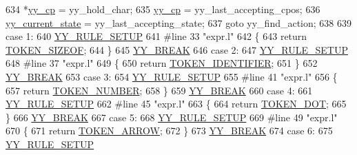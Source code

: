\begin{DoxyCode}
634                         *\mbox{\hyperlink{expr-lex_8cpp_aebf8322d98e81db5af081bb22a5f06fe}{yy\_cp}} = yy\_hold\_char;
635                         \mbox{\hyperlink{expr-lex_8cpp_aebf8322d98e81db5af081bb22a5f06fe}{yy\_cp}} = yy\_last\_accepting\_cpos;
636                         \mbox{\hyperlink{expr-lex_8cpp_abb8b9672f94e21056888ae611b41cd1b}{yy\_current\_state}} = yy\_last\_accepting\_state;
637                         \textcolor{keywordflow}{goto} yy\_find\_action;
638 
639 \textcolor{keywordflow}{case} 1:
640 \mbox{\hyperlink{expr-lex_8cpp_a690504b662e4281515bf12722df178ba}{YY\_RULE\_SETUP}}
641 \textcolor{preprocessor}{#line 33 "expr.l"}
642 \{
643         \textcolor{keywordflow}{return} \mbox{\hyperlink{expr_8cpp_a6e19bb26b1cf6e33e3021ad463c1abb2}{TOKEN\_SIZEOF}};
644 \}
645         \mbox{\hyperlink{expr-lex_8cpp_a3cc40a460ad7df816678bcc05241e84c}{YY\_BREAK}}
646 \textcolor{keywordflow}{case} 2:
647 \mbox{\hyperlink{expr-lex_8cpp_a690504b662e4281515bf12722df178ba}{YY\_RULE\_SETUP}}
648 \textcolor{preprocessor}{#line 37 "expr.l"}
649 \{
650         \textcolor{keywordflow}{return} \mbox{\hyperlink{expr_8cpp_a008e051bec0c25081d2800989f86bce7}{TOKEN\_IDENTIFIER}};
651 \}
652         \mbox{\hyperlink{expr-lex_8cpp_a3cc40a460ad7df816678bcc05241e84c}{YY\_BREAK}}
653 \textcolor{keywordflow}{case} 3:
654 \mbox{\hyperlink{expr-lex_8cpp_a690504b662e4281515bf12722df178ba}{YY\_RULE\_SETUP}}
655 \textcolor{preprocessor}{#line 41 "expr.l"}
656 \{
657         \textcolor{keywordflow}{return} \mbox{\hyperlink{expr_8cpp_afab46303ed22655c1acbdad1c6f78df3}{TOKEN\_NUMBER}};
658 \}
659         \mbox{\hyperlink{expr-lex_8cpp_a3cc40a460ad7df816678bcc05241e84c}{YY\_BREAK}}
660 \textcolor{keywordflow}{case} 4:
661 \mbox{\hyperlink{expr-lex_8cpp_a690504b662e4281515bf12722df178ba}{YY\_RULE\_SETUP}}
662 \textcolor{preprocessor}{#line 45 "expr.l"}
663 \{
664         \textcolor{keywordflow}{return} \mbox{\hyperlink{expr_8cpp_aa5a331da77f5956fbc4e825deed94687}{TOKEN\_DOT}};
665 \}       
666         \mbox{\hyperlink{expr-lex_8cpp_a3cc40a460ad7df816678bcc05241e84c}{YY\_BREAK}}
667 \textcolor{keywordflow}{case} 5:
668 \mbox{\hyperlink{expr-lex_8cpp_a690504b662e4281515bf12722df178ba}{YY\_RULE\_SETUP}}
669 \textcolor{preprocessor}{#line 49 "expr.l"}
670 \{
671         \textcolor{keywordflow}{return} \mbox{\hyperlink{expr_8cpp_af6b51f1bfc2736f77d7ad045926f470d}{TOKEN\_ARROW}};
672 \}
673         \mbox{\hyperlink{expr-lex_8cpp_a3cc40a460ad7df816678bcc05241e84c}{YY\_BREAK}}
674 \textcolor{keywordflow}{case} 6:
675 \mbox{\hyperlink{expr-lex_8cpp_a690504b662e4281515bf12722df178ba}{YY\_RULE\_SETUP}}

\end{DoxyCode}
